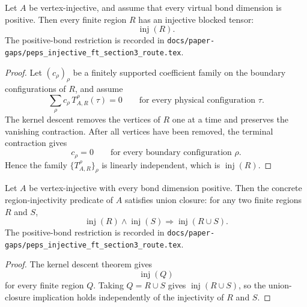 \begin{theorem}%
    \label{thm:peps_regionBlockedTensorInjective_of_isVertexInjective}
    \leanok
    Let $A$ be vertex-injective, and assume that every virtual bond dimension is
    positive. Then every finite region $R$ has an injective blocked tensor:
    \[
        \operatorname{inj}(R).
    \]
    The positive-bond restriction is recorded in
    \texttt{docs/paper-gaps/peps\_injective\_ft\_section3\_route.tex}.
\end{theorem}
\begin{proof}\leanok
    Let $(c_\rho)_\rho$ be a finitely supported coefficient family on the
    boundary configurations of $R$, and assume
    \[
        \sum_{\rho} c_\rho\,T_{A,R}^{\rho}(\tau)=0
        \qquad\text{for every physical configuration }\tau .
    \]
    The kernel descent removes the vertices of $R$ one at a time and preserves
    the vanishing contraction. After all vertices have been removed, the
    terminal contraction gives
    \[
        c_\rho=0\qquad\text{for every boundary configuration }\rho .
    \]
    Hence the family $\{T_{A,R}^{\rho}\}_\rho$ is linearly independent, which is
    $\operatorname{inj}(R)$.
\end{proof}

\begin{theorem}%
    \label{thm:peps_regionInjectivityUnionClosure_of_isVertexInjective}
    \leanok
    Let $A$ be vertex-injective with every bond dimension positive. Then the
    concrete region-injectivity predicate of $A$ satisfies union closure: for
    any two finite regions $R$ and $S$,
    \[
        \operatorname{inj}(R)\wedge\operatorname{inj}(S)
        \Longrightarrow
        \operatorname{inj}(R\cup S).
    \]
    The positive-bond restriction is recorded in
    \texttt{docs/paper-gaps/peps\_injective\_ft\_section3\_route.tex}.
\end{theorem}
\begin{proof}\leanok
    The kernel descent theorem gives
    \[
        \operatorname{inj}(Q)
    \]
    for every finite region $Q$. Taking $Q=R\cup S$ gives
    $\operatorname{inj}(R\cup S)$, so the union-closure implication holds
    independently of the injectivity of $R$ and $S$.
\end{proof}

